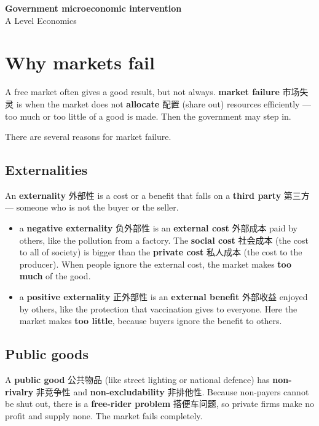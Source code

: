 \documentclass[11pt]{article}
\begin{document}
\begin{center}
  {\LARGE\bfseries Government microeconomic intervention}\\[0.35em]
  {\large A Level Economics}
\end{center}
\vspace{0.6em}

\section*{Why markets fail}

A free market often gives a good result, but not always. \textbf{market failure} 市场失灵 is when the market does not \textbf{allocate} 配置 (share out) resources efficiently — too much or too little of a good is made. Then the government may step in.

There are several reasons for market failure.

\subsection*{Externalities}

An \textbf{externality} 外部性 is a cost or a benefit that falls on a \textbf{third party} 第三方 — someone who is not the buyer or the seller.

\begin{itemize}
\item a \textbf{negative externality} 负外部性 is an \textbf{external cost} 外部成本 paid by others, like the pollution from a factory. The \textbf{social cost} 社会成本 (the cost to all of society) is bigger than the \textbf{private cost} 私人成本 (the cost to the producer). When people ignore the external cost, the market makes \textbf{too much} of the good.

\item a \textbf{positive externality} 正外部性 is an \textbf{external benefit} 外部收益 enjoyed by others, like the protection that vaccination gives to everyone. Here the market makes \textbf{too little}, because buyers ignore the benefit to others.

\end{itemize}

\subsection*{Public goods}

A \textbf{public good} 公共物品 (like street lighting or national defence) has \textbf{non-rivalry} 非竞争性 and \textbf{non-excludability} 非排他性. Because non-payers cannot be shut out, there is a \textbf{free-rider problem} 搭便车问题, so private firms make no profit and supply none. The market fails completely.
\end{document}
